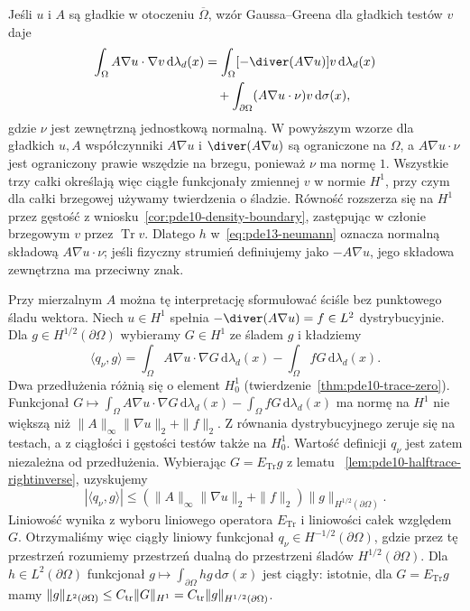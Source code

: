 \begin{uwaga}
Jeśli $u$ i $A$ są gładkie w otoczeniu $\overline\Omega$,
wzór Gaussa--Greena
dla gładkich testów $v$ daje
\[
 \begin{aligned}
 \int_\Omega A\nabla u\cdot\nabla v\,\mathrm d\lambda_d(x)
 &=\int_\Omega[-\diver(A\nabla u)]v\,\mathrm d\lambda_d(x)\\
 &\quad+\int_{\partial\Omega}(A\nabla u\cdot\nu)
 v\,\mathrm d\sigma(x),
 \end{aligned}
\]
gdzie $\nu$ jest zewnętrzną jednostkową normalną.
W powyższym wzorze dla gładkich $u,A$ współczynniki
$A\nabla u$ i $\diver(A\nabla u)$ są ograniczone na $\Omega$,
a $A\nabla u\cdot\nu$ jest ograniczony prawie wszędzie
na brzegu, ponieważ $\nu$ ma normę $1$.
Wszystkie trzy całki określają więc ciągłe funkcjonały
zmiennej $v$ w normie $H^1$, przy czym dla całki brzegowej
używamy twierdzenia o śladzie. Równość rozszerza się na
$H^1$ przez gęstość z wniosku~\ref{cor:pde10-density-boundary},
zastępując w członie brzegowym $v$ przez $\operatorname{Tr}v$.
Dlatego $h$ w~\eqref{eq:pde13-neumann} oznacza normalną
składową $A\nabla u\cdot\nu$; jeśli fizyczny strumień
definiujemy jako $-A\nabla u$, jego składowa zewnętrzna
ma przeciwny znak.

Przy mierzalnym $A$ można tę interpretację sformułować
ściśle bez punktowego śladu wektora.
Niech $u\in H^1$ spełnia $-\diver(A\nabla u)=f\in L^2$
dystrybucyjnie. Dla $g\in H^{1/2}(\partial\Omega)$
wybieramy $G\in H^1$ ze śladem $g$ i kładziemy
\[
 \langle q_\nu,g\rangle
 =\int_\Omega A\nabla u\cdot\nabla G\,\mathrm d\lambda_d(x)
 -\int_\Omega fG\,\mathrm d\lambda_d(x).
\]
Dwa przedłużenia różnią się o element $H_0^1$
(twierdzenie~\ref{thm:pde10-trace-zero}). Funkcjonał
$G\mapsto\int_\Omega A\nabla u\cdot\nabla G\,\mathrm d\lambda_d(x)
-\int_\Omega fG\,\mathrm d\lambda_d(x)$
ma normę na $H^1$ nie większą niż
$\|A\|_\infty\|\nabla u\|_2+\|f\|_2$.
Z równania dystrybucyjnego zeruje się na testach, a z ciągłości
i gęstości testów także na $H_0^1$. Wartość definicji
$q_\nu$ jest zatem niezależna od przedłużenia.
Wybierając $G=E_{\operatorname{Tr}}g$ z lematu
~\ref{lem:pde10-halftrace-rightinverse}, uzyskujemy
\[
 |\langle q_\nu,g\rangle|
 \le(\|A\|_\infty\|\nabla u\|_2+\|f\|_2)
 \|g\|_{H^{1/2}(\partial\Omega)}.
\]
Liniowość wynika z wyboru liniowego operatora
$E_{\operatorname{Tr}}$ i liniowości całek względem $G$.
Otrzymaliśmy więc ciągły liniowy funkcjonał
$q_\nu\in H^{-1/2}(\partial\Omega)$, gdzie przez tę przestrzeń
rozumiemy przestrzeń dualną do przestrzeni śladów
$H^{1/2}(\partial\Omega)$.
Dla $h\in L^2(\partial\Omega)$ funkcjonał
$g\mapsto\int_{\partial\Omega}hg\,\mathrm d\sigma(x)$
jest ciągły: istotnie, dla $G=E_{\operatorname{Tr}}g$ mamy
$\|g\|_{L^2(\partial\Omega)}\le C_{\rm tr}\|G\|_{H^1}
=C_{\rm tr}\|g\|_{H^{1/2}(\partial\Omega)}$.


\end{uwaga}
